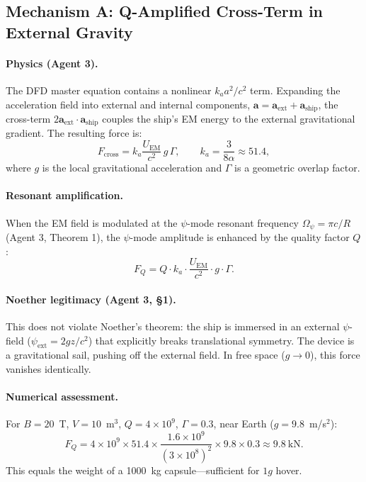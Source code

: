 \documentclass[12pt,aps,prd,superscriptaddress,nofootinbib,longbibliography]{revtex4-2}
\newcommand{\avec}{\mathbf{a}}
\newcommand{\ka}{k_a}
\begin{document}
\subsection{Mechanism A: Q-Amplified Cross-Term in External Gravity}

\paragraph{Physics (Agent 3).}
The DFD master equation contains a nonlinear $\ka a^2/c^2$ term.
Expanding the acceleration field into external and internal components,
$\avec = \avec_{\mathrm{ext}} + \avec_{\mathrm{ship}}$, the cross-term
$2\avec_{\mathrm{ext}} \cdot \avec_{\mathrm{ship}}$ couples the ship's
EM energy to the external gravitational gradient.  The resulting force is:
\begin{equation}
F_{\mathrm{cross}} = \ka \frac{U_{\mathrm{EM}}}{c^2} \, g \, \Gamma,
\qquad \ka = \frac{3}{8\alpha} \approx 51.4,
\label{eq:F-cross}
\end{equation}
where $g$ is the local gravitational acceleration and $\Gamma$ is a
geometric overlap factor.

\paragraph{Resonant amplification.}
When the EM field is modulated at the $\psi$-mode resonant frequency
$\Omega_\psi = \pi c/R$ (Agent 3, Theorem 1), the $\psi$-mode amplitude
is enhanced by the quality factor $Q$:
\begin{equation}
\boxed{F_Q = Q \cdot \ka \cdot \frac{U_{\mathrm{EM}}}{c^2} \cdot g \cdot \Gamma.}
\label{eq:F-Q}
\end{equation}

\paragraph{Noether legitimacy (Agent 3, \S1).}
This does not violate Noether's theorem: the ship is immersed in an
external $\psi$-field ($\psi_{\mathrm{ext}} = 2gz/c^2$) that explicitly
breaks translational symmetry.  The device is a gravitational sail,
pushing off the external field.  In free space ($g \to 0$), this force
vanishes identically.

\paragraph{Numerical assessment.}
For $B = 20$~T, $V = 10$~m$^3$, $Q = 4 \times 10^9$, $\Gamma = 0.3$,
near Earth ($g = 9.8$~m/s$^2$):
\begin{equation}
F_Q = 4 \times 10^9 \times 51.4 \times \frac{1.6 \times 10^9}{(3 \times 10^8)^2}
\times 9.8 \times 0.3 \approx 9.8~\mathrm{kN}.
\end{equation}
This equals the weight of a 1000~kg capsule---sufficient for $1g$ hover.
\end{document}

